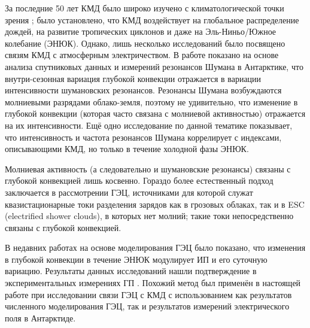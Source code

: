 За последние 50 лет КМД было широко изучено с климатологической точки зрения \cite{Madden_Julian_1994, Zhang_2005, Zhang_et_al_2020}; было установлено, что КМД воздействует на глобальное распределение дождей, на развитие тропических циклонов и даже на Эль-Ниньо/Южное колебание (ЭНЮК). Однако, лишь несколько исследований было посвящено связям КМД с атмосферным электричеством. В работе \cite{Anyamba_et_al_2000} показано на основе анализа спутниковых данных и измерений резонансов Шумана в Антарктике, что внутри-сезонная вариация глубокой конвекции отражается в вариации интенсивности шумановских резонансов. Резонансы Шумана возбуждаются молниевыми разрядами облако-земля, поэтому не удивительно, что изменение в глубокой конвекции (которая часто связана с молниевой активностью) отражается на их интенсивности. Ещё одно исследование по данной тематике \cite{Beggan_Musur_2019} показывает, что интенсивность и частота резонансов Шумана коррелирует с индексами, описывающими КМД, но только в течение холодной фазы ЭНЮК.

Молниевая активность (а следовательно и шумановские резонансы) связаны с глубокой конвекцией лишь косвенно. Гораздо более естественный подход заключается в рассмотрении ГЭЦ, источниками для которой служат квазистационарные токи разделения зарядов как в грозовых облаках, так и в ESC (electrified shower clouds), в которых нет молний; такие токи непосредственно связаны с глубокой конвекцией.

В недавних работах \cite{Slyunyaev_et_al_2021a,Slyunyaev_et_al_2021b} на основе моделирования ГЭЦ было показано, что изменения в глубокой конвекции в течение ЭНЮК модулирует ИП и его суточную вариацию. Результаты данных исследований нашли подтверждение в экспериментальных измерениях ГП \cite{Harrison_et_al_2011,Slyunyaev_et_al_2021c}. Похожий метод был применён в настоящей работе при исследовании связи ГЭЦ с КМД с использованием как результатов численного моделирования ГЭЦ, так и результатов измерений электрического поля в Антарктиде.
